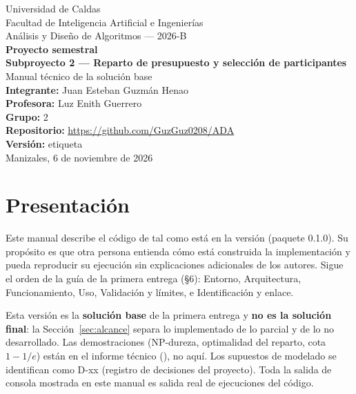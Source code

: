 \documentclass[11pt,a4paper]{article}
\begin{document}
\begin{titlepage}
\centering
{\large Universidad de Caldas\\ Facultad de Inteligencia Artificial e Ingenierías\\[0.3cm]}
{\large Análisis y Diseño de Algoritmos — 2026-B\\[2cm]}
{\LARGE\bfseries Proyecto semestral\\[0.3cm]
Subproyecto 2 — Reparto de presupuesto y selección de participantes\\[0.6cm]}
{\Large Manual técnico de la solución base\\[2cm]}
{\large \textbf{Integrante:} Juan Esteban Guzmán Henao\\[0.3cm]
\textbf{Profesora:} Luz Enith Guerrero\\[0.3cm]
\textbf{Grupo:} 2\\[0.3cm]
\textbf{Repositorio:} \url{https://github.com/GuzGuz0208/ADA}\\[0.3cm]
\textbf{Versión:} etiqueta \\[2cm]}
{\large Manizales, 6 de noviembre de 2026}
\end{titlepage}

\tableofcontents
\newpage

\section*{Presentación}
Este manual describe el código de  tal como está en la versión  (paquete 0.1.0). Su propósito es que otra persona entienda cómo está construida la implementación y pueda reproducir su ejecución sin explicaciones adicionales de los autores. Sigue el orden de la guía de la primera entrega (§6): Entorno, Arquitectura, Funcionamiento, Uso, Validación y límites, e Identificación y enlace.

Esta versión es la \textbf{solución base} de la primera entrega y \textbf{no es la solución final}: la Sección~\ref{sec:alcance} separa lo implementado de lo parcial y de lo no desarrollado. Las demostraciones (NP-dureza, optimalidad del reparto, cota $1-1/e$) están en el informe técnico (), no aquí. Los supuestos de modelado se identifican como D-xx (registro de decisiones del proyecto). Toda la salida de consola mostrada en este manual es salida real de ejecuciones del código.
\end{document}
